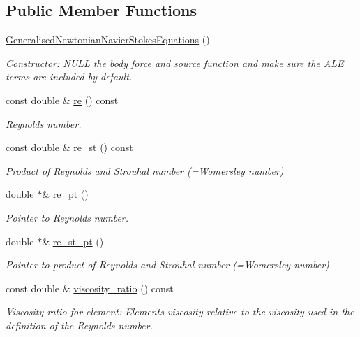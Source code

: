 \subsection*{Public Member Functions}
\begin{DoxyCompactItemize}
\item 
\hyperlink{classoomph_1_1GeneralisedNewtonianNavierStokesEquations_a90c3261233223113f6a4365acf1a7ee8}{Generalised\+Newtonian\+Navier\+Stokes\+Equations} ()
\begin{DoxyCompactList}\small\item\em Constructor\+: N\+U\+LL the body force and source function and make sure the A\+LE terms are included by default. \end{DoxyCompactList}\item 
const double \& \hyperlink{classoomph_1_1GeneralisedNewtonianNavierStokesEquations_af26fb6fab52a4b5ef06e8e595d07c09f}{re} () const
\begin{DoxyCompactList}\small\item\em Reynolds number. \end{DoxyCompactList}\item 
const double \& \hyperlink{classoomph_1_1GeneralisedNewtonianNavierStokesEquations_ae34dc7d7205f341405f90a26e92ba327}{re\+\_\+st} () const
\begin{DoxyCompactList}\small\item\em Product of Reynolds and Strouhal number (=Womersley number) \end{DoxyCompactList}\item 
double $\ast$\& \hyperlink{classoomph_1_1GeneralisedNewtonianNavierStokesEquations_ab172943aec8d114a81edfd862c7d4afd}{re\+\_\+pt} ()
\begin{DoxyCompactList}\small\item\em Pointer to Reynolds number. \end{DoxyCompactList}\item 
double $\ast$\& \hyperlink{classoomph_1_1GeneralisedNewtonianNavierStokesEquations_aefecd5aff65184ed54fca9c45e0b27ba}{re\+\_\+st\+\_\+pt} ()
\begin{DoxyCompactList}\small\item\em Pointer to product of Reynolds and Strouhal number (=Womersley number) \end{DoxyCompactList}\item 
const double \& \hyperlink{classoomph_1_1GeneralisedNewtonianNavierStokesEquations_a2eb6191b31a8f3be23f4f288bb71dec8}{viscosity\+\_\+ratio} () const
\begin{DoxyCompactList}\small\item\em Viscosity ratio for element\+: Element\textquotesingle{}s viscosity relative to the viscosity used in the definition of the Reynolds number. \end{DoxyCompactList}\item 

\end{DoxyCompactItemize}
